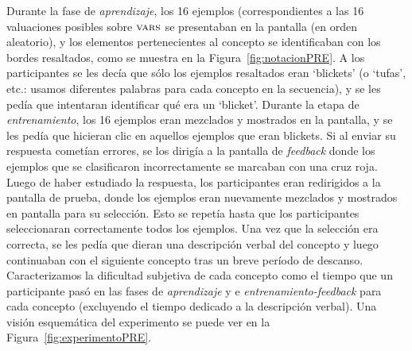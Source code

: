 Durante la fase de {\em aprendizaje}, los 16 ejemplos (correspondientes a las 16 valuaciones posibles sobre $\textsc{vars}$ se presentaban en la pantalla (en orden aleatorio), y los elementos pertenecientes al concepto se identificaban con los bordes resaltados, como se muestra en la Figura~\ref{fig:notacionPRE}. A los participantes se les decía que sólo los ejemplos resaltados eran `blickets' (o `tufas', etc.: usamos diferentes palabras para cada concepto en la secuencia), y se les pedía que intentaran identificar qué era un `blicket'. Durante la etapa de {\em entrenamiento}, los 16 ejemplos eran mezclados y mostrados en la pantalla, y se les pedía que hicieran clic en aquellos ejemplos que eran blickets. Si al enviar su respuesta cometían errores, se los dirigía a la pantalla de {\em feedback} donde los ejemplos que se clasificaron incorrectamente se marcaban con una cruz roja. Luego de haber estudiado la respuesta, los participantes eran redirigidos a la pantalla de prueba, donde los ejemplos eran nuevamente mezclados y mostrados en pantalla para su selección. Esto se repetía hasta que los participantes seleccionaran correctamente todos los ejemplos. Una vez que la selección era correcta, se les pedía que dieran una descripción verbal del concepto y luego continuaban con el siguiente concepto tras un breve período de descanso. Caracterizamos la dificultad subjetiva de cada concepto como el tiempo que un participante pasó en las fases de {\em aprendizaje} y e {\em entrenamiento-feedback} para cada concepto (excluyendo el tiempo dedicado a la descripción verbal). Una visión esquemática del experimento se puede ver en la Figura~\ref{fig:experimentoPRE}.

